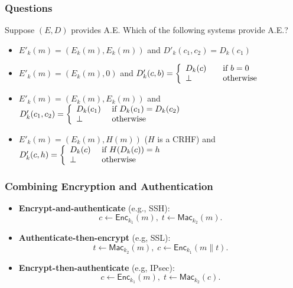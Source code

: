 \begin{frame}\frametitle{Questions}
\begin{exampleblock}{Suppose $(E, D)$ provides A.E. Which of the following systems provide A.E.? }
\begin{itemize}
\item $E'_{k}(m) = \left( E_{k}(m), E_{k}(m)\right)$ and $D'_{k}(c_{1}, c_{2}) = D_{k}(c_{1})$ %
\item $E'_{k}(m) = \left( E_{k}(m), 0\right)$ and %
$ D'_{k}(c, b) = \left\{ 
  \begin{array}{l l}
    D_{k}(c) & \quad \text{if $b = 0$}\\
    \perp & \quad \text{otherwise}\\
  \end{array} \right. $
\item $E'_{k}(m) = \left( E_{k}(m), E_{k}(m)\right)$ and %
$ D'_{k}(c_{1}, c_{2}) = \left\{ 
  \begin{array}{l l}
    D_{k}(c_{1}) & \ \text{if $D_{k}(c_{1}) = D_{k}(c_{2})$}\\
    \perp & \ \text{otherwise}\\
  \end{array} \right. $
\item $E'_{k}(m) = \left( E_{k}(m), H(m)\right)$ ($H$ is a CRHF) and %
$ D'_{k}(c, h) = \left\{ 
  \begin{array}{l l}
    D_{k}(c) & \ \text{if $H(D_{k}(c))=h$}\\
    \perp & \ \text{otherwise}\\
  \end{array} \right. $ 
\end{itemize}
\end{exampleblock}
\end{frame}
\begin{frame}\frametitle{Combining Encryption and Authentication}
\begin{figure}
\begin{center}

\end{center}
\end{figure}
\begin{itemize}
\item \textbf{Encrypt-and-authenticate} (e.g., SSH):\[ c \gets \mathsf{Enc}_{k_1}(m),\; t \gets \mathsf{Mac}_{k_2}(m).\]
\item \textbf{Authenticate-then-encrypt} (e.g, SSL):\[ t \gets \mathsf{Mac}_{k_2}(m),\; c \gets \mathsf{Enc}_{k_1}(m\| t).\]
\item \textbf{Encrypt-then-authenticate} (e.g, IPsec):\[ c \gets \mathsf{Enc}_{k_1}(m),\; t \gets \mathsf{Mac}_{k_2}(c). \]
\end{itemize}
\end{frame}
